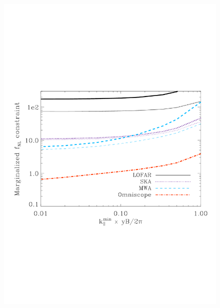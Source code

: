 \documentclass{PoS}
\begin{document}
\begin{figure}[!t]
\includegraphics[scale=0.38]{figures/figure4_trim.pdf}

\end{figure}
\end{document}
